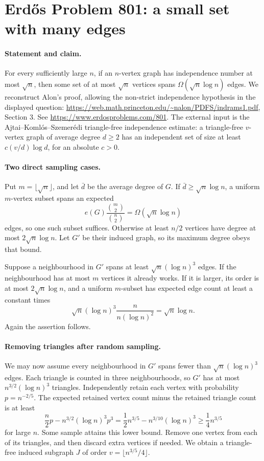 \section*{Erd\H{o}s Problem 801: a small set with many edges}

\paragraph{Statement and claim.}
For every sufficiently large \(n\), if an \(n\)-vertex graph
has independence number at most \(\sqrt n\), then some
set of at most \(\sqrt n\) vertices spans
\(\Omega(\sqrt n\log n)\) edges.
We reconstruct Alon's proof, allowing the non-strict
independence hypothesis in the displayed question:
\url{https://web.math.princeton.edu/~nalon/PDFS/indrams1.pdf},
Section 3. See \url{https://www.erdosproblems.com/801}.
The external input is the Ajtai--Koml\'os--Szemer\'edi
triangle-free independence estimate: a triangle-free
\(v\)-vertex graph of average degree \(d\geq2\) has an
independent set of size at least \(c(v/d)\log d\),
for an absolute \(c>0\).

\paragraph{Two direct sampling cases.}
Put \(m=\lfloor\sqrt n\rfloor\), and let \(\bar d\) be the
average degree of \(G\). If \(\bar d\geq\sqrt n\log n\),
a uniform \(m\)-vertex subset spans an expected
\[
 e(G)\frac{\binom m2}{\binom n2}
 =\Omega(\sqrt n\log n)
\]
edges, so one such subset suffices.
Otherwise at least \(n/2\) vertices have degree at most
\(2\sqrt n\log n\). Let \(G'\) be their induced graph,
so its maximum degree obeys that bound.

Suppose a neighbourhood in \(G'\) spans at least
\(\sqrt n(\log n)^3\) edges.
If the neighbourhood has at most \(m\) vertices it already
works. If it is larger, its order is at most
\(2\sqrt n\log n\), and a uniform \(m\)-subset has expected
edge count at least a constant times
\[
 \sqrt n(\log n)^3
 \frac{n}{n(\log n)^2}
 =\sqrt n\log n.
\]
Again the assertion follows.

\paragraph{Removing triangles after random sampling.}
We may now assume every neighbourhood in \(G'\) spans
fewer than \(\sqrt n(\log n)^3\) edges.
Each triangle is counted in three neighbourhoods, so
\(G'\) has at most \(n^{3/2}(\log n)^3\) triangles.
Independently retain each vertex with probability
\(p=n^{-2/5}\).
The expected retained vertex count minus the retained
triangle count is at least
\[
 \frac n2p-n^{3/2}(\log n)^3p^3
 =\frac12n^{3/5}-n^{3/10}(\log n)^3
 \geq\frac14 n^{3/5}
\]
for large \(n\).
Some sample attains this lower bound.
Remove one vertex from each of its triangles, and then
discard extra vertices if needed.
We obtain a triangle-free induced subgraph \(J\) of order
\(v=\lfloor n^{3/5}/4\rfloor\).

